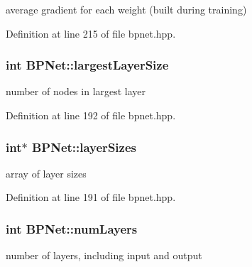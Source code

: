 average gradient for each weight (built during training) 



Definition at line 215 of file bpnet.\+hpp.

\subsubsection[{\texorpdfstring{largest\+Layer\+Size}{largestLayerSize}}]{\setlength{\rightskip}{0pt plus 5cm}int B\+P\+Net\+::largest\+Layer\+Size\hspace{0.3cm}{\ttfamily [protected]}}\hypertarget{classBPNet_a60c06f158b82c2ee8a95df4f0c46235d}{}\label{classBPNet_a60c06f158b82c2ee8a95df4f0c46235d}


number of nodes in largest layer 



Definition at line 192 of file bpnet.\+hpp.

\subsubsection[{\texorpdfstring{layer\+Sizes}{layerSizes}}]{\setlength{\rightskip}{0pt plus 5cm}int$\ast$ B\+P\+Net\+::layer\+Sizes\hspace{0.3cm}{\ttfamily [protected]}}\hypertarget{classBPNet_a9f59cc3cc5e0972d473e26a4fb47b5c6}{}\label{classBPNet_a9f59cc3cc5e0972d473e26a4fb47b5c6}


array of layer sizes 



Definition at line 191 of file bpnet.\+hpp.

\subsubsection[{\texorpdfstring{num\+Layers}{numLayers}}]{\setlength{\rightskip}{0pt plus 5cm}int B\+P\+Net\+::num\+Layers\hspace{0.3cm}{\ttfamily [protected]}}\hypertarget{classBPNet_aaabccfce85225083b21b02a3b3065c81}{}\label{classBPNet_aaabccfce85225083b21b02a3b3065c81}


number of layers, including input and output 



